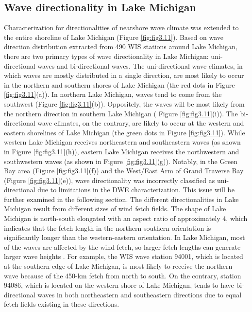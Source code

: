 \subsection{Wave directionality in Lake Michigan}
\label{Wave directionality in Lake Michigan}

Characterization for directionalities of nearshore wave climate was extended to
the entire shoreline of Lake Michigan (Figure \ref{fig:fig3.11}). Based on wave
direction distribution extracted from 490 WIS stations around Lake Michigan,
there are two primary types of wave directionality in Lake Michigan:
uni-directional waves and bi-directional waves. The uni-directional wave
climates, in which waves are mostly distributed in a single direction, are most
likely to occur in the northern and southern shores of Lake Michigan (the red
dots in Figure \ref{fig:fig3.11}(a)). In northern Lake Michigan, waves tend to
come from the southwest (\eg Figure \ref{fig:fig3.11}(b)). Oppositely, the waves
will be most likely from the northern direction in southern Lake Michigan (\eg
Figure \ref{fig:fig3.11}(i)). The bi-directional wave climates, on the contrary,
are likely to occur at the western and eastern shorelines of Lake Michigan (the
green dots in Figure \ref{fig:fig3.11}). While western Lake Michigan receives
northeastern and southeastern waves (as shown in Figure \ref{fig:fig3.11}(h)),
eastern Lake Michigan receives the northwestern and southwestern waves (as shown
in Figure \ref{fig:fig3.11}(g)). Notably, in the Green Bay area (Figure
\ref{fig:fig3.11}(f)) and the West/East Arm of Grand Traverse Bay (Figure
\ref{fig:fig3.11}(e)), wave directionality was incorrectly classified as
uni-directional due to limitations in the DWE characterization. This issue will
be further examined in the following section. The different directionalities in
Lake Michigan result from different sizes of wind fetch fields. The shape of
Lake Michigan is north-south elongated with an aspect ratio of approximately 4,
which indicates that the fetch length in the northern-southern orientation is
significantly longer than the western-eastern orientation. In Lake Michigan,
most of the waves are affected by the wind fetch, so larger fetch lengths can
generate larger wave heights \citep{mason_effective_2018}. For example, the WIS
wave station 94001, which is located at the southern edge of Lake Michigan, is
most likely to receive the northern wave because of the 450-km fetch from north
to south. On the contrary, station 94086, which is located on the western shore
of Lake Michigan, tends to have bi-directional waves in both northeastern and
southeastern directions due to equal fetch fields existing in these directions. 

